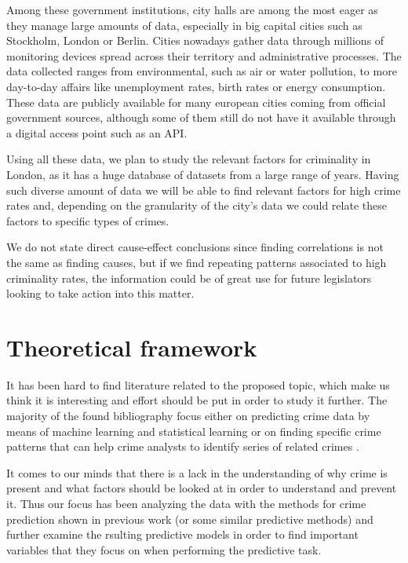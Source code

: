 \documentclass[12pt, openany]{report}
\begin{document}
Among these government institutions, city halls are among the most eager as they manage large amounts of data, especially in big capital cities such as Stockholm, London or Berlin. Cities nowadays gather data  through millions of monitoring devices spread across their territory and administrative processes. The data collected ranges from environmental, such as air or water pollution, to more day-to-day affairs like unemployment rates, birth rates or energy consumption. These data are publicly available for many european cities coming from official government sources, although some of them still do not have it available through a digital access point such as an API.

Using all these data, we plan to study the relevant factors for criminality in London, as it has a huge database of datasets from a large range of years. Having such diverse amount of data we will be able to find relevant factors for high crime rates and, depending on the granularity of the city's data we could relate these factors to specific types of crimes.

We do not state direct cause-effect conclusions since finding correlations is not the same as finding causes, but if we find repeating patterns associated to high criminality rates, the information could be of great use for future legislators looking to take action into this matter.

\section{Theoretical framework}

It has been hard to find literature related to the proposed topic, which make us think it is interesting and effort should be put in order to study it further. The majority of the found bibliography focus either on predicting crime data by means of machine learning \cite{mcclendon15} and statistical learning \cite{berk09} or on finding specific crime patterns that can help crime analysts to identify series of related crimes \cite{wang13}.

It comes to our minds that there is a lack in the understanding of why crime is present and what factors should be looked at in order to understand and prevent it. Thus our focus has been analyzing the data with the methods for crime prediction shown in previous work \cite{powers11} (or some similar predictive methods) and further examine the rsulting predictive models in order to find important variables that they focus on when performing the predictive task.
\end{document}
